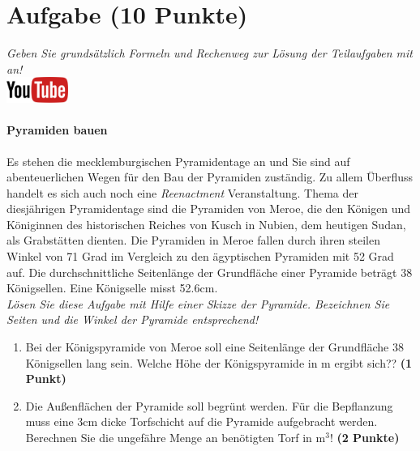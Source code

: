 \documentclass[a4paper, 9pt]{scrartcl}\usepackage[]{graphicx}\usepackage[]{xcolor}
\begin{document}
 
\clearpage

\section{Aufgabe \hfill (10 Punkte)}

\textit{Geben Sie grunds{\"a}tzlich Formeln und Rechenweg zur L{\"o}sung der
  Teilaufgaben mit an!} \\[1Ex]

\hfill\href{https://youtu.be/tDgr6fpkkYA}{\includegraphics[width =
  2cm]{img/youtube}} %
\hspace{2Ex}

\paragraph{Pyramiden bauen}



Es stehen die mecklemburgischen Pyramidentage an und Sie sind auf
abenteuerlichen Wegen f{\"u}r den Bau der Pyramiden zust{\"a}ndig. Zu allem
{\"U}berfluss handelt es sich auch noch eine \textit{Reenactment}
Veranstaltung. Thema der diesj{\"a}hrigen Pyramidentage sind die Pyramiden von
Meroe, die den K{\"o}nigen und K{\"o}niginnen des historischen Reiches von Kusch in
Nubien, dem heutigen Sudan, als Grabst{\"a}tten dienten. Die Pyramiden in Meroe
fallen durch ihren steilen Winkel von 71 Grad im Vergleich zu
den {\"a}gyptischen Pyramiden mit 52 Grad auf. Die durchschnittliche
Seitenl{\"a}nge der Grundfl{\"a}che einer Pyramide betr{\"a}gt 38 K{\"o}nigsellen. Eine K{\"o}nigselle
misst 52.6cm.\\

\textit{L{\"o}sen Sie diese Aufgabe mit Hilfe einer Skizze der Pyramide. Bezeichnen
  Sie Seiten und die Winkel der Pyramide entsprechend!}

\begin{enumerate}
\item Bei der K{\"o}nigspyramide von Meroe soll eine Seitenl{\"a}nge der Grundfl{\"a}che
  38 K{\"o}nigsellen lang sein. Welche H{\"o}he der K{\"o}nigspyramide in m
  ergibt sich?? \textbf{(1 Punkt)}
\item Die Au{\ss}enfl{\"a}chen der Pyramide soll begr{\"u}nt werden. F{\"u}r die
  Bepflanzung muss eine 3cm dicke Torfschicht auf die
  Pyramide aufgebracht werden. Berechnen Sie die ungef{\"a}hre Menge an
  ben{\"o}tigten Torf in m$^3$! \textbf{(2 Punkte)}
\end{enumerate}
\end{document}
